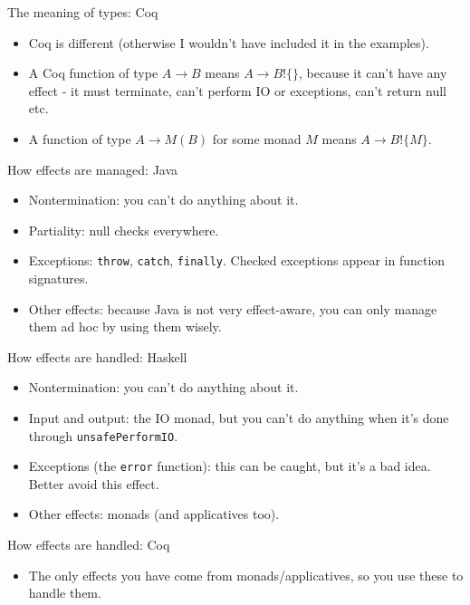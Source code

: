 \documentclass{beamer}
\newcommand{\eff}[2]{#1 ! \{ #2 \}}
\begin{document}
\begin{frame}{The meaning of types: Coq}
\begin{itemize}
	\item Coq is different (otherwise I wouldn't have included it in the examples).
	\item A Coq function of type $A \to B$ means $A \to \eff{B}{}$, because it can't have any effect - it must terminate, can't perform IO or exceptions, can't return null etc.
	\item A function of type $A \to M(B)$ for some monad $M$ means $A \to \eff{B}{M}$.
\end{itemize}
\end{frame}

\begin{frame}{How effects are managed: Java}
\begin{itemize}
	\item Nontermination: you can't do anything about it.
	\item Partiality: null checks everywhere.
	\item Exceptions: \texttt{throw}, \texttt{catch}, \texttt{finally}. Checked exceptions appear in function signatures.
	\item Other effects: because Java is not very effect-aware, you can only manage them ad hoc by using them wisely.
\end{itemize}
\end{frame}

\begin{frame}{How effects are handled: Haskell}
\begin{itemize}
	\item Nontermination: you can't do anything about it.
	\item Input and output: the IO monad, but you can't do anything when it's done through \texttt{unsafePerformIO}.
	\item Exceptions (the \texttt{error} function): this can be caught, but it's a bad idea. Better avoid this effect.
	\item Other effects: monads (and applicatives too).
\end{itemize}
\end{frame}

\begin{frame}{How effects are handled: Coq}
\begin{itemize}
	\item The only effects you have come from monads/applicatives, so you use these to handle them.
\end{itemize}
\end{frame}
\end{document}
